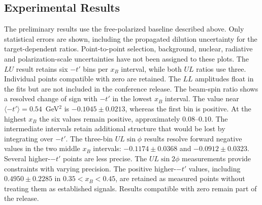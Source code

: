 \subsection{Experimental Results}\label{sec:release_results}
The preliminary results use the free-polarized baseline described above. Only statistical errors are shown, including the propagated dilution uncertainty for the target-dependent ratios. Point-to-point selection, background, nuclear, radiative and polarization-scale uncertainties have not been assigned to these plots. The $LU$ result retains six $-t'$ bins per $x_B$ interval, while both $UL$ ratios use three. Individual points compatible with zero are retained. The $LL$ amplitudes float in the fits but are not included in the conference release.
The beam-spin ratio shows a resolved change of sign with $-t'$ in the lowest $x_B$ interval. The value near $\langle-t'\rangle=0.54$~GeV$^2$ is $-0.1045\pm0.0213$, whereas the first bin is positive. At the highest $x_B$ the six values remain positive, approximately $0.08$--$0.10$. The intermediate intervals retain additional structure that would be lost by integrating over $-t'$.
The three-bin $UL\sin\phi$ results resolve forward negative values in the two middle $x_B$ intervals: $-0.1174\pm0.0368$ and $-0.0912\pm0.0323$. Several higher-$-t'$ points are less precise. The $UL\sin2\phi$ measurements provide constraints with varying precision. The positive higher-$-t'$ values, including $0.4950\pm0.2285$ in $0.35<x_B<0.45$, are retained as measured points without treating them as established signals. Results compatible with zero remain part of the release.

